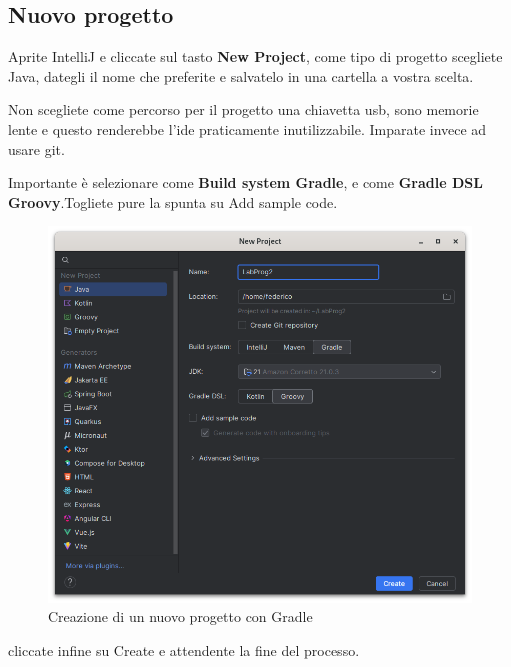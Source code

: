     \subsection{Nuovo progetto}
    Aprite IntelliJ e cliccate sul tasto \textbf{New Project}, come tipo di progetto scegliete Java, dategli il nome che preferite e salvatelo in una cartella a 
    vostra scelta.
    \begin{warningbox}
        Non scegliete come percorso per il progetto una chiavetta usb, sono memorie lente e questo renderebbe l'ide praticamente inutilizzabile.
        Imparate invece ad usare git.
    \end{warningbox}
    Importante è selezionare come \textbf{Build system Gradle}, e come \textbf{Gradle DSL Groovy}.Togliete pure la spunta su Add sample code.
    \begin{figure}[H]
        \centering
        \graphicspath{{src/capitoli/05/img/}}
        \includegraphics[width=\textwidth]{new_project.png}
        \caption{Creazione di un nuovo progetto con Gradle}
        \label{fig:Creazione di un nuovo progetto con Gradle}
    \end{figure}
    cliccate infine su Create e attendente la fine del processo.


